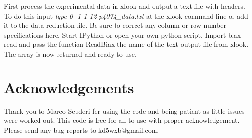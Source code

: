 \documentclass[a4paper,11pt,oneside]{article}
\begin{document}
First process the experimental data in xlook and output a text file with headers.  To do this input \emph{type 0 -1 1 12 p4074\_data.txt} at the xlook command line or add it to the data reduction file.  Be sure to correct any column or row number specifications here.  Start IPython or open your own python script.  Import biax read and pass the function ReadBiax the name of the text output file from xlook.  The array is now returned and ready to use.  

\section{Acknowledgements}
Thank you to Marco Scuderi for using the code and being patient as little issues were worked out.  This code is free for all to use with proper acknowledgement.  Please send any bug reports to kd5wxb@gmail.com.

\noindent%
\begin{minipage}{\linewidth}
\end{minipage}


\newpage
\end{document}
